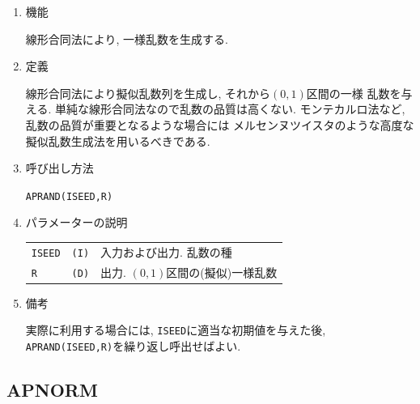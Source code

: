\documentclass[a4j]{jarticle}
\begin{document}
\begin{enumerate}

\item 機能 

線形合同法により, 一様乱数を生成する.

\item 定義

線形合同法により擬似乱数列を生成し, それから$(0,1)$区間の一様
乱数を与える. 単純な線形合同法なので乱数の品質は高くない.
モンテカルロ法など, 乱数の品質が重要となるような場合には
メルセンヌツイスタのような高度な擬似乱数生成法を用いるべきである.

\item 呼び出し方法 
    
{\tt APRAND(ISEED,R)}
  
\item パラメーターの説明 
    
\begin{tabular}{lll}
{\tt ISEED} & {\tt (I)} & 入力および出力. 乱数の種\\
{\tt R} & {\tt (D)} & 出力. $(0,1)$区間の(擬似)一様乱数
\end{tabular}

\item 備考

実際に利用する場合には, {\tt ISEED}に適当な初期値を与えた後,
{\tt APRAND(ISEED,R)}を繰り返し呼出せばよい.

\end{enumerate}


\subsection{APNORM}
\end{document}
